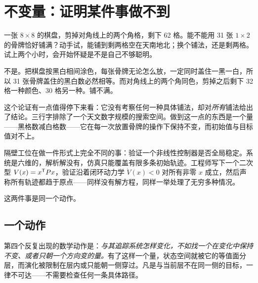 \section{不变量：证明某件事做不到}
\label{sec:18-Synthesis/02-Recurring-Ideas/04}

一张 \(8\times 8\) 的棋盘，剪掉对角线上的两个角格，剩下 62 格。能不能用 31 张 \(1\times 2\) 的骨牌恰好铺满？动手试，能铺到剩两格空在天南地北；换个铺法，还是剩两格。试上两个小时，会开始怀疑是不是自己不够聪明。

不是。把棋盘按黑白相间涂色，每张骨牌无论怎么放，一定同时盖住一黑一白，所以 31 张骨牌盖住的黑白数必然相等。而对角线上的两个角同色，剪掉之后剩下 32 格一种颜色、30 格另一种。铺不满。

这个论证有一点值得停下来看：它没有考察任何一种具体铺法，却对\emph{所有}铺法给出了结论。三行字排除了一个天文数字规模的搜索空间。做到这一点的东西是一个量——黑格数减白格数——它在每一次放置骨牌的操作下保持不变，而初始值与目标值对不上。

隔壁工位在做一件形式上完全不同的事：验证一个非线性控制器是否全局稳定。系统是六维的，解析解没有，仿真只能覆盖有限多条初始轨迹。工程师写下一个二次型 \(V(x)=x^{\mathsf{T}}Px\)，验证沿着闭环动力学 \(\dot V(x)<0\) 对所有非零 \(x\) 成立，然后声称所有轨迹都趋于原点——同样没有解方程，同样一举处理了无穷多种情况。

这两件事是同一个动作。

\subsection{一个动作}

第四个反复出现的数学动作是：\emph{与其追踪系统怎样变化，不如找一个在变化中保持不变、或者只朝一个方向变的量。}有了这样一个量，状态空间就被它的等值面分层，而演化被限制在层内或只能朝一侧穿过。凡是与当前层不在同一侧的目标，一律不可达——不需要检查任何一条具体路径。

